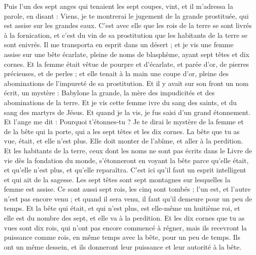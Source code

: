 \begin{multicols}{2}
\VerseOne{}Puis l'un des sept anges qui tenaient les sept coupes, vint, et il m’adressa la parole, en disant : Viens, je te montrerai le jugement de la grande prostituée, qui est assise sur les grandes eaux.
C’est avec elle que les rois de la terre se sont livrés à la fornication, et c’est du vin de sa prostitution que les habitants de la terre se sont enivrés.
Il me transporta en esprit dans un désert ; et je vis une femme assise sur une bête écarlate, pleine de noms de blasphème, ayant sept têtes et dix cornes.
Et la femme était vêtue de pourpre et d'écarlate, et parée d'or, de pierres précieuses, et de perles ; et elle tenait à la main une coupe d'or, pleine des abominations de l'impureté de sa prostitution.
Et il y avait sur son front un nom écrit, un mystère : Babylone la grande, la mère des impudicités et des abominations de la terre{}.
Et je vis cette femme ivre du sang des saints, et du sang des martyrs de Jésus. Et quand je la vis, je fus saisi d'un grand étonnement.
Et l'ange me dit : Pourquoi t'étonnes-tu ? Je te dirai le mystère de la femme et de la bête qui la porte, qui a les sept têtes et les dix cornes.
La bête que tu as vue, était, et elle n'est plus. Elle doit monter de l'abîme, et aller à la perdition. Et les habitants de la terre, ceux dont les noms ne sont pas écrits dans le Livre de vie dès la fondation du monde, s'étonneront en voyant la bête parce qu’elle était, et qu’elle n'est plus, et qu’elle reparaîtra.
C'est ici qu’il faut un esprit intelligent et qui ait de la sagesse. Les sept têtes sont sept montagnes sur lesquelles la femme est assise.
Ce sont aussi sept rois, les cinq sont tombés ; l'un est, et l'autre n'est pas encore venu ; et quand il sera venu, il faut qu'il demeure pour un peu de temps.
Et la bête qui était, et qui n'est plus, est elle-même un huitième roi, et elle est du nombre des sept, et elle va à la perdition.
Et les dix cornes que tu as vues sont dix rois, qui n'ont pas encore commencé à régner, mais ils recevront la puissance comme rois, en même temps avec la bête, pour un peu de temps.
Ils ont un même dessein, et ils donneront leur puissance et leur autorité à la bête.

\end{multicols}
